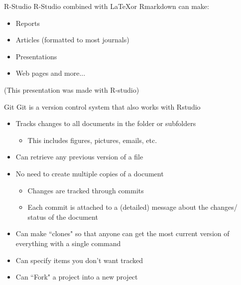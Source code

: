 \documentclass{beamer}\usepackage[]{graphicx}\usepackage[]{color}
\begin{document}
\begin{frame}{R-Studio}
R-Studio combined with \LaTeX or Rmarkdown can make:\\
\begin{itemize}
\item Reports
\item Articles (formatted to most journals)
\item Presentations
\item Web pages and more...
\end{itemize}
\pause
\bigskip
(This presentation was made with R-studio)
\end{frame}

\begin{frame}{Git}
Git is a version control system that also works with Rstudio
\bigskip
\begin{itemize}
\item Tracks changes to all documents in the folder or subfolders
  \begin{itemize}
  \item This includes figures, pictures, emails, etc.
  \end{itemize}
\pause
\item Can retrieve any previous version of a file
\pause 
\item No need to create multiple copies of a document
\pause
  \begin{itemize}
  \item Changes are tracked through commits
  \pause
  \item Each commit is attached to a (detailed) message about the changes/ status of the document
  \end{itemize}
  \pause
\item Can make ``clones" so that anyone can get the most current version of everything with a single command
\pause
\item Can specify items you don't want tracked
\pause
\item Can ``Fork" a project into a new project
\end{itemize}
\end{frame}
\end{document}
